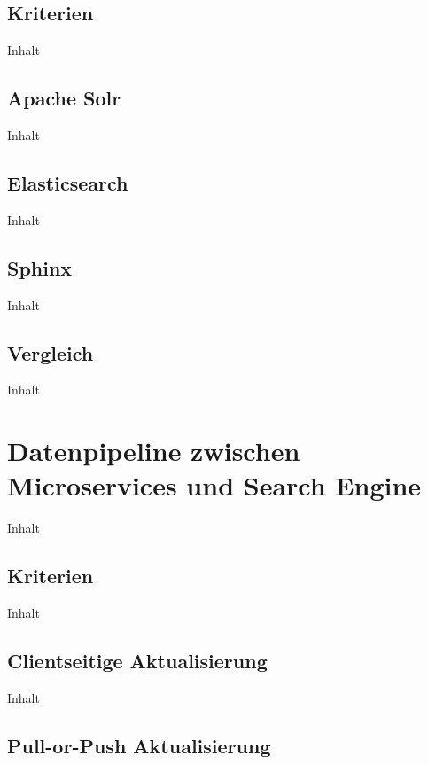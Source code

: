 \subsection{Kriterien\label{subsec4.3.1:Unterunterpunkt-1}}

Inhalt

\subsection{Apache Solr\label{subsec4.3.2:Unterunterpunkt-2}}

Inhalt

\subsection{Elasticsearch\label{subsec4.3.3:Unterunterpunkt-3}}

Inhalt

\subsection{Sphinx\label{subsec4.3.4:Unterunterpunkt-4}}

Inhalt

\subsection{Vergleich\label{subsec4.3.5:Unterunterpunkt-5}}

Inhalt

\section{Datenpipeline zwischen Microservices und Search Engine\label{sec4.4:Unterpunkt-4}}

Inhalt

\subsection{Kriterien\label{subsec4.4.1:Unterunterpunkt-1}}

Inhalt

\subsection{Clientseitige Aktualisierung\label{subsec4.4.2:Unterunterpunkt-2}}

Inhalt

\subsection{Pull-or-Push Aktualisierung\label{subsec4.4.3:Unterunterpunkt-3}}


